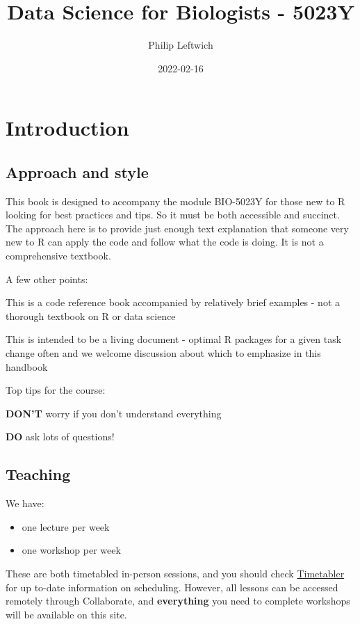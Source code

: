 \documentclass[
]{book}
\title{Data Science for Biologists - 5023Y}
\author{Philip Leftwich}
\date{2022-02-16}
\providecommand{\tightlist}{%
  \setlength{\itemsep}{0pt}\setlength{\parskip}{0pt}}
\begin{document}
\maketitle

{
\setcounter{tocdepth}{1}
\tableofcontents
}
\hypertarget{introduction}{%
\chapter{Introduction}\label{introduction}}

\hypertarget{approach-and-style}{%
\section{Approach and style}\label{approach-and-style}}

This book is designed to accompany the module BIO-5023Y for those new to R looking for best practices and tips. So it must be both accessible and succinct. The approach here is to provide just enough text explanation that someone very new to R can apply the code and follow what the code is doing. It is not a comprehensive textbook.

A few other points:

This is a code reference book accompanied by relatively brief examples - not a thorough textbook on R or data science

This is intended to be a living document - optimal R packages for a given task change often and we welcome discussion about which to emphasize in this handbook

Top tips for the course:

\textbf{DON'T} worry if you don't understand everything

\textbf{DO} ask lots of questions!

\hypertarget{teaching}{%
\section{Teaching}\label{teaching}}

We have:

\begin{itemize}
\tightlist
\item
  one lecture per week
\item
  one workshop per week
\end{itemize}

These are both timetabled in-person sessions, and you should check \href{https://timetabler.uea.ac.uk/Timetable}{Timetabler} for up to-date information on scheduling. However, all lessons can be accessed remotely through Collaborate, and \textbf{everything} you need to complete workshops will be available on this site.
\end{document}
